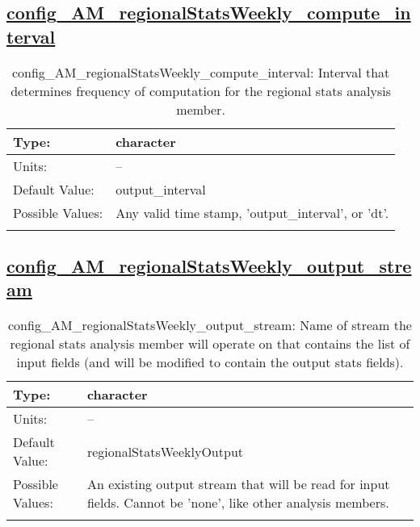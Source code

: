 \subsection[config\_AM\_regionalStatsWeekly\_compute\_interval]{\hyperref[sec:nm_tab_AM_regionalStatsWeekly]{config\_AM\_regionalStatsWeekly\_compute\_interval}}
\label{subsec:nm_sec_config_AM_regionalStatsWeekly_compute_interval}
\begin{center}
\begin{longtable}{| p{2.0in} || p{4.0in} |}
    \hline
    Type: & character \\
    \hline
    Units: & -- \\
    \hline
    Default Value: & output\_interval \\
    \hline
    Possible Values: & Any valid time stamp, 'output\_interval', or 'dt'. \\
    \hline
    \caption{config\_AM\_regionalStatsWeekly\_compute\_interval: Interval that determines frequency of computation for the regional stats analysis member.}
\end{longtable}
\end{center}
\subsection[config\_AM\_regionalStatsWeekly\_output\_stream]{\hyperref[sec:nm_tab_AM_regionalStatsWeekly]{config\_AM\_regionalStatsWeekly\_output\_stream}}
\label{subsec:nm_sec_config_AM_regionalStatsWeekly_output_stream}
\begin{center}
\begin{longtable}{| p{2.0in} || p{4.0in} |}
    \hline
    Type: & character \\
    \hline
    Units: & -- \\
    \hline
    Default Value: & regionalStatsWeeklyOutput \\
    \hline
    Possible Values: & An existing output stream that will be read for input fields. Cannot be 'none', like other analysis members. \\
    \hline
    \caption{config\_AM\_regionalStatsWeekly\_output\_stream: Name of stream the regional stats analysis member will operate on that contains the list of input fields (and will be modified to contain the output stats fields).}
\end{longtable}
\end{center}
